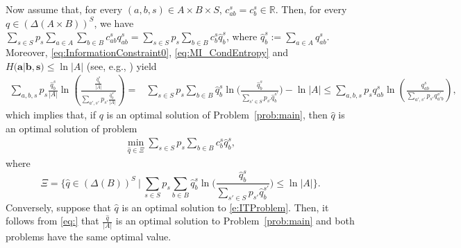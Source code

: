 \documentclass[smallextended,referee,envcountsect,]{svjour3}
\newcommand{\R}{{\mathbb R}}
\newcommand{\bd}{\textbf}
\newcommand{\Menge}[2]{\bigg\{{#1}~\bigg|~{#2}\bigg\}}
\begin{document}
{Now assume that, for every $(a,b,s)\in A\times B\times 
S$, $c_{ab}^s=c_b^s\in\R$. Then, for every $q\in (\Delta(A\times 
B))^S$, we have $\sum_{s\in S}p_s\sum_{a\in A}\sum_{b\in 
B}c_{ab}^sq_{ab}^s=\sum_{s\in S}p_s\sum_{b\in 
B}c_{b}^s\widehat{q}_{b}^s$,
where $\widehat{q}_b^s:=\sum_{a\in A} 
q_{ab}^s$. Moreover, \eqref{eq:InformationConstraint0}, 
\eqref{eq:MI_CondEntropy} and $H(\bd{a}|\bd{b},\bd{s}) \leq \ln|A|$ 
(see, e.g.,  \cite[Theorem~2.6.4]{cover-book-2006}) yield
\begin{align}
\sum_{a,b,s}p_s\frac{\widehat{q}_b^s}{|A|}\ln 
\left(\frac{\frac{\widehat{q}_b^s}{|A|}}
{\sum_{a',s'}p_{s'}\frac{\widehat{q}_{b}^{s'}}{|A|}}\right) 
=& \sum_{s\in S}p_s\sum_{b\in B}\widehat{q}_{b}^s\ln 
\Bigg(\frac{\widehat{q}_{b}^s}{\sum\limits_{s'\in S}p_{s'}
\widehat{q}_{b}^{s'}}\Bigg) - \ln|A|  \leq  \sum_{a,b,s}p_sq_{ab}^s\ln 
\left(\frac{q_{ab}^s}{\sum_{a',s'}p_{s'}q_{a'b}^{s'}}\right)\label{eq:},
\end{align}
which implies that, if ${q}$ is an optimal solution of 
Problem~\ref{prob:main}, then $\widehat{q}$ is an optimal solution 
of problem
\begin{align}
\label{e:ITProblem}
\min_{\widehat{q}\in\Xi}{\sum_{s\in 
S}p_s\sum_{b\in B}c_{b}^s\widehat{q}_{b}^s},
\end{align}
where $$\Xi=\Menge{\widehat{q}\in(\Delta(B))^{ 
S}}{\sum_{s\in 
S}p_s\sum_{b\in B}\widehat{q}_{b}^s\ln 
\Bigg(\frac{\widehat{q}_{b}^s}{\sum\limits_{s'\in S}p_{s'}
\widehat{q}_{b}^{s'}}\Bigg)\leq 
\ln|A|}.$$
Conversely, suppose that $\widehat{q}$ is an optimal solution to 
\eqref{e:ITProblem}. Then, it follows from \eqref{eq:} that 
$\frac{\widehat{q}}{|A|}$ is an optimal 
solution to Problem~\ref{prob:main} and both 
problems have the same optimal value.}
\end{document}
